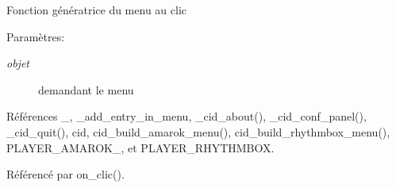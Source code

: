 Fonction génératrice du menu au clic \begin{Desc}
\item[Paramètres:]
\begin{description}
\item[{\em objet}]demandant le menu \end{description}
\end{Desc}


Références \_\-, \_\-add\_\-entry\_\-in\_\-menu, \_\-cid\_\-about(), \_\-cid\_\-conf\_\-panel(), \_\-cid\_\-quit(), cid, cid\_\-build\_\-amarok\_\-menu(), cid\_\-build\_\-rhythmbox\_\-menu(), PLAYER\_\-AMAROK\_, et PLAYER\_\-RHYTHMBOX.

Référencé par on\_\-clic().